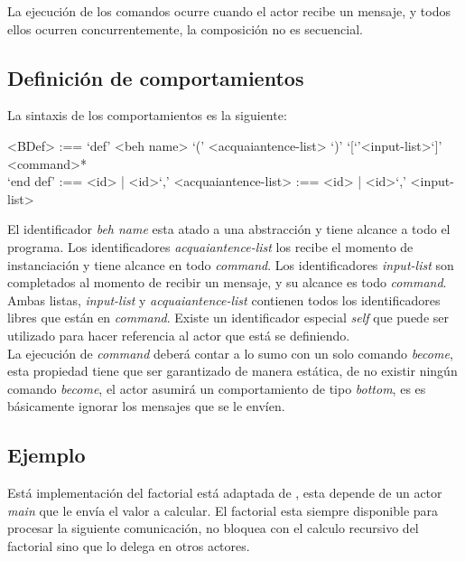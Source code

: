\documentclass[fleqn]{article}
\begin{document}
La ejecución de los comandos ocurre cuando el actor recibe un mensaje, y todos
ellos ocurren concurrentemente, la composición no es secuencial.

\subsection{Definición de comportamientos}

La sintaxis de los comportamientos es la siguiente:

\begin{grammar}
 <BDef> :== `def' <beh name> `(' <acquaiantence-list> `)' `[`'<input-list>`]' \\
  \quad <command>* \\
  `end def'
   :== <id> | <id>`,' <acquaiantence-list>
   :== <id> | <id>`,' <input-list>
\end{grammar}

El identificador \textit{beh name} esta atado a una abstracción y tiene alcance
a todo el programa. Los identificadores \textit{acquaiantence-list} los recibe el
momento de instanciación y tiene alcance en todo \textit{command}. Los
identificadores \textit{input-list} son completados al momento de recibir un
mensaje, y su alcance es todo \textit{command}. \\
Ambas listas, \textit{input-list} y \textit{acquaiantence-list} contienen todos
los identificadores libres que están en \textit{command}. Existe un
identificador especial \textit{self} que puede ser utilizado para hacer
referencia al actor que está se definiendo. \\
La ejecución de \textit{command} deberá contar a lo sumo con un solo comando
\textit{become}, esta propiedad tiene que ser garantizado de manera estática, de no
existir ningún comando \textit{become}, el actor asumirá un comportamiento de
tipo \textit{bottom}, es es básicamente ignorar los mensajes que se le envíen.

\subsection{Ejemplo}

Está implementación del factorial está adaptada de \cite{Agha:1986:AMC:7929}, esta
depende de un actor \textit{main} que le envía el valor a calcular. El factorial
esta siempre disponible para procesar la siguiente comunicación, no bloquea con
el calculo recursivo del factorial sino que lo delega en otros actores.
\end{document}

